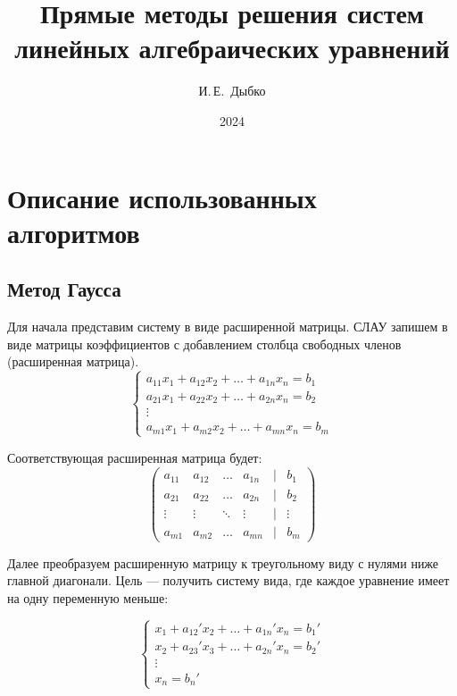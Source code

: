 \documentclass[12pt, a4paper]{article}
\title{Прямые методы решения систем
	линейных алгебраических уравнений}
\author{И.\,Е.~Дыбко}
\date{2024}
\begin{document}
	
	\maketitle
	
	\tableofcontents
	\section{Описание использованных алгоритмов}
	
	\subsection{Метод Гаусса}		
	Для начала представим систему в виде расширенной матрицы. СЛАУ запишем в виде матрицы коэффициентов с добавлением столбца свободных членов (расширенная матрица).
	\begin{equation*}
		\begin{cases}
			a_{11}x_1 + a_{12}x_2 + \dots + a_{1n}x_n = b_1 \\
			a_{21}x_1 + a_{22}x_2 + \dots + a_{2n}x_n = b_2 \\
			\vdots \\
			a_{m1}x_1 + a_{m2}x_2 + \dots + a_{mn}x_n = b_m
		\end{cases}
	\end{equation*}
	
	Соответствующая расширенная матрица будет:
	\begin{equation*}
		\begin{pmatrix}
			a_{11} & a_{12} & \dots & a_{1n} & | & b_1 \\
			a_{21} & a_{22} & \dots & a_{2n} & | & b_2 \\
			\vdots & \vdots & \ddots & \vdots & | & \vdots \\
			a_{m1} & a_{m2} & \dots & a_{mn} & | & b_m
		\end{pmatrix}
	\end{equation*}
	
	Далее преобразуем расширенную матрицу к треугольному виду с нулями ниже главной диагонали. Цель — получить систему вида, где каждое уравнение имеет на одну переменную меньше:
	
	\begin{equation*}
		\begin{cases}
			x_1 + a_{12}'x_2 + \dots + a_{1n}'x_n = b_1' \\
			x_2 + a_{23}'x_3 + \dots + a_{2n}'x_n = b_2' \\
			\vdots \\
			x_n = b_n'
		\end{cases}
	\end{equation*}
	
\end{document}
